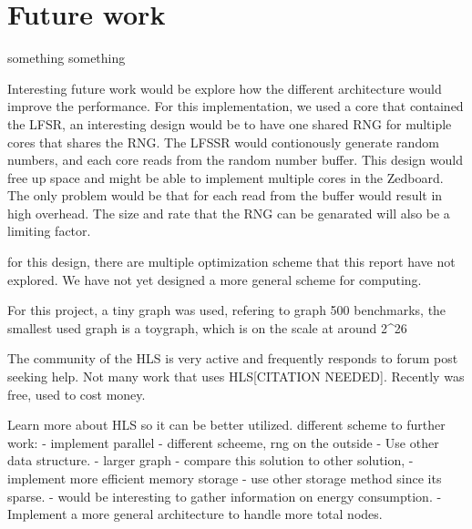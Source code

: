 \chapter{Future work} \label{futureWork}
something something

Interesting future work would be explore how the different architecture would improve the performance. For this implementation, we used a core that contained the LFSR, an interesting design would be to have one shared RNG for multiple cores that shares the RNG. The LFSSR would contionously generate random numbers, and each core reads from the random number buffer. This design would free up space and might be able to implement multiple cores in the Zedboard. The only problem would be that for each read from the buffer would result in high overhead. The size and rate that the RNG can be genarated will also be a limiting factor.

for this design, there are multiple optimization scheme that this report have not explored. We have not yet designed a more general scheme for computing. 

For this project, a tiny graph was used, refering to graph 500 benchmarks, the smallest used graph is a toygraph, which is on the scale at around 2^26

The community of the HLS is very active and frequently responds to forum post seeking help.	Not many work that uses HLS[CITATION NEEDED]. Recently was free, used to cost money.


Learn more about HLS so it can be better utilized. 
different scheme to further work:
- implement parallel
- different scheeme, rng on the outside
- Use other data structure.
- larger graph
- compare this solution to other solution, 
- implement more efficient memory storage
- use other storage method since its sparse. 
- would be interesting to gather information on  energy consumption.
- Implement a more general architecture to handle more total nodes.

